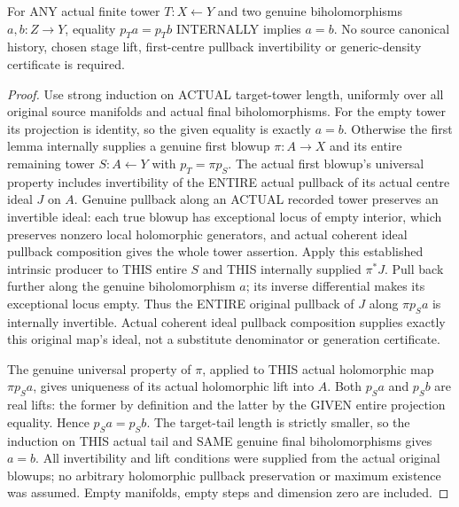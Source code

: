 \begin{theorem}
\label{hir:original-actual-whole-projection-biholomorphic-map-uniqueness}
\leanok
For ANY actual finite tower $T:X\leftarrow Y$ and two genuine
biholomorphisms $a,b:Z\to Y$, equality $p_Ta=p_Tb$ INTERNALLY implies
$a=b$. No source canonical history, chosen stage lift, first-centre
pullback invertibility or generic-density certificate is required.
\end{theorem}
\begin{proof}
Use strong induction on ACTUAL target-tower length, uniformly over all
original source manifolds and actual final biholomorphisms. For the empty
tower its projection is identity, so the given equality is exactly $a=b$.
Otherwise the first lemma internally supplies a genuine first blowup
$\pi:A\to X$ and its entire remaining tower $S:A\leftarrow Y$ with
$p_T=\pi p_S$. The actual first blowup's universal property includes
invertibility of the ENTIRE actual pullback of its actual centre ideal
$J$ on $A$. Genuine pullback along an ACTUAL recorded tower preserves an
invertible ideal: each true blowup has exceptional locus of empty interior,
which preserves nonzero local holomorphic generators, and actual coherent
ideal pullback composition gives the whole tower assertion. Apply this
established intrinsic producer to THIS entire $S$ and THIS internally
supplied $\pi^*J$. Pull back further along the genuine biholomorphism $a$;
its inverse differential makes its exceptional locus empty. Thus the
ENTIRE original pullback of $J$ along $\pi p_Sa$ is internally invertible.
Actual coherent ideal pullback composition supplies exactly this original
map's ideal, not a substitute denominator or generation certificate.

The genuine universal property of $\pi$, applied to THIS actual holomorphic
map $\pi p_Sa$, gives uniqueness of its actual holomorphic lift into $A$.
Both $p_Sa$ and $p_Sb$ are real lifts: the former by definition and the
latter by the GIVEN entire projection equality. Hence $p_Sa=p_Sb$.
The target-tail length is strictly smaller, so the induction on THIS
actual tail and SAME genuine final biholomorphisms gives $a=b$. All
invertibility and lift conditions were supplied from the actual original
blowups; no arbitrary holomorphic pullback preservation or maximum
existence was assumed. Empty manifolds, empty steps and dimension zero
are included.
\end{proof}

